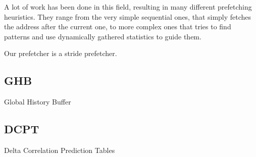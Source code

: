 A lot of work has been done in this field, resulting in many different
prefetching heuristics. They range from the very simple sequential ones, that
simply fetches the address after the current one, to more complex ones that
tries to find patterns and use dynamically gathered statistics to guide them.

Our prefetcher is a stride prefetcher.

\subsection{GHB}
Global History Buffer

\subsection{DCPT}
Delta Correlation Prediction Tables
